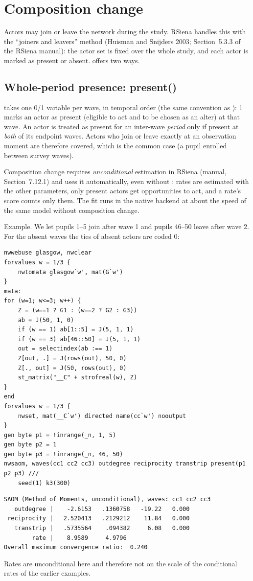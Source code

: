 \section{Composition change}\label{sec:compchange}

Actors may join or leave the network during the study. RSiena handles this with the ``joiners and leavers'' method (Huisman and Snijders 2003; Section~5.3.3 of the RSiena manual): the actor set is fixed over the whole study, and each actor is marked as present or absent. \nwsaom{} offers two ways.

\subsection{Whole-period presence: present()}

 takes one 0/1 variable per wave, in temporal order (the same convention as ): 1 marks an actor as present (eligible to act and to be chosen as an alter) at that wave. An actor is treated as present for an inter-wave \emph{period} only if present at \emph{both} of its endpoint waves. Actors who join or leave exactly at an observation moment are therefore covered, which is the common case (a pupil enrolled between survey waves).

Composition change requires \emph{unconditional} estimation in RSiena (manual, Section~7.12.1) and \nwsaom{} uses it automatically, even without : rates are estimated with the other parameters, only present actors get opportunities to act, and a rate's score counts only them. The fit runs in the native backend at about the speed of the same model without composition change.

Example. We let pupils 1--5 join after wave 1 and pupils 46--50 leave after wave 2. For the absent waves the ties of absent actors are coded 0:

\begin{lstlisting}
nwwebuse glasgow, nwclear
forvalues w = 1/3 {
    nwtomata glasgow`w', mat(G`w')
}
mata:
for (w=1; w<=3; w++) {
    Z = (w==1 ? G1 : (w==2 ? G2 : G3))
    ab = J(50, 1, 0)
    if (w == 1) ab[1::5] = J(5, 1, 1)
    if (w == 3) ab[46::50] = J(5, 1, 1)
    out = selectindex(ab :== 1)
    Z[out, .] = J(rows(out), 50, 0)
    Z[., out] = J(50, rows(out), 0)
    st_matrix("__C" + strofreal(w), Z)
}
end
forvalues w = 1/3 {
    nwset, mat(__C`w') directed name(cc`w') nooutput
}
gen byte p1 = !inrange(_n, 1, 5)
gen byte p2 = 1
gen byte p3 = !inrange(_n, 46, 50)
nwsaom, waves(cc1 cc2 cc3) outdegree reciprocity transtrip present(p1 p2 p3) ///
    seed(1) k3(300)
\end{lstlisting}
\begin{lstlisting}
SAOM (Method of Moments, unconditional), waves: cc1 cc2 cc3
   outdegree |    -2.6153   .1360758   -19.22   0.000
 reciprocity |   2.520413   .2129212    11.84   0.000
   transtrip |   .5735564    .094382     6.08   0.000
        rate |    8.9589     4.9796
Overall maximum convergence ratio:  0.240
\end{lstlisting}
Rates are unconditional here and therefore not on the scale of the conditional rates of the earlier examples.

